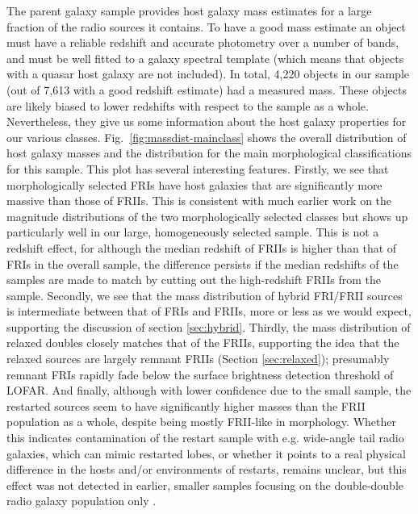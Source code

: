 \documentclass{aa}
\begin{document}
The parent galaxy sample \citep{hardcastle23} provides host galaxy mass estimates for a large fraction of the radio sources it contains. To have a good mass estimate an object must have a reliable redshift and accurate photometry over a number of bands, and must be well fitted to a galaxy spectral template (which means that objects with a quasar host galaxy are not included). In total, 4,220 objects in our sample (out of 7,613 with a good redshift estimate) had a measured mass. These objects are likely biased to lower redshifts with respect to the sample as a whole. Nevertheless, they give us some information about the host galaxy properties for our various classes. Fig.\ \ref{fig:massdist-mainclass} shows the overall distribution of host galaxy masses and the distribution for the main morphological classifications for this sample. This plot has several interesting features. Firstly, we see that morphologically selected FRIs have host galaxies that are significantly more massive than those of FRIIs. This is consistent with much earlier work on the magnitude distributions of the two morphologically selected classes \citep{lilly84,owen+laing89,zirbel96} but shows up particularly well in our large, homogeneously selected sample. This is not a redshift effect, for although the median redshift of FRIIs is higher than that of FRIs in the overall sample, the difference persists if the median redshifts of the samples are made to match by cutting out the high-redshift FRIIs from the sample. Secondly, we see that the mass distribution of hybrid FRI/FRII sources is intermediate between that of FRIs and FRIIs, more or less as we would expect, supporting the discussion of section \ref{sec:hybrid}. Thirdly, the mass distribution of relaxed doubles closely matches that of the FRIIs, supporting the idea that the relaxed sources are largely remnant FRIIs (Section \ref{sec:relaxed}); presumably remnant FRIs rapidly fade below the surface brightness detection threshold of LOFAR. And finally, although with lower confidence due to the small sample, the restarted sources seem to have significantly higher masses than the FRII population as a whole, despite being mostly FRII-like in morphology. Whether this indicates contamination of the restart sample with e.g. wide-angle tail radio galaxies, which can mimic restarted lobes, or whether it points to a real physical difference in the hosts and/or environments of restarts, remains unclear, but this effect was not detected in earlier, smaller samples focusing on the double-double radio galaxy population only \citep{mahatma19}.
\end{document}
